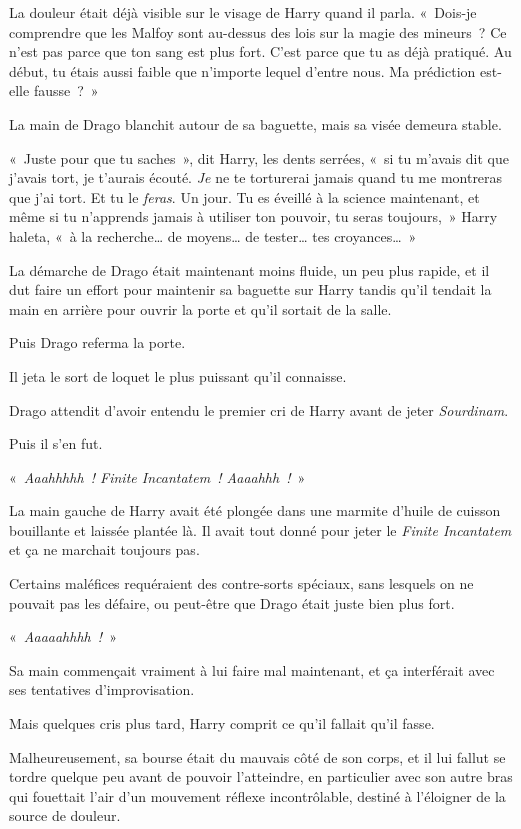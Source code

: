 La douleur était déjà visible sur le visage de Harry quand il parla.
«~Dois-je comprendre que les Malfoy sont au-dessus des lois sur la magie des mineurs~?
Ce n'est pas parce que ton sang est plus fort.
C'est parce que tu as déjà pratiqué.
Au début, tu étais aussi faible que n'importe lequel d'entre nous.
Ma prédiction est-elle fausse~?~»

La main de Drago blanchit autour de sa baguette, mais sa visée demeura stable.

«~Juste pour que tu saches~», dit Harry, les dents serrées, «~si tu m'avais dit que j'avais tort, je t'aurais écouté.
\emph{Je} ne te torturerai jamais quand tu me montreras que j'ai tort.
Et tu le \emph{feras}.
Un jour.
Tu es éveillé à la science maintenant, et même si tu n'apprends jamais à utiliser ton pouvoir, tu seras toujours,~» Harry haleta, «~à la recherche… de moyens… de tester… tes croyances…~»

La démarche de Drago était maintenant moins fluide, un peu plus rapide, et il dut faire un effort pour maintenir sa baguette sur Harry tandis qu'il tendait la main en arrière pour ouvrir la porte et qu'il sortait de la salle.

Puis Drago referma la porte.

Il jeta le sort de loquet le plus puissant qu'il connaisse.

Drago attendit d'avoir entendu le premier cri de Harry avant de jeter \emph{Sourdinam}.

Puis il s'en fut.

\later

«~\emph{Aaahhhhh~!
Finite Incantatem~!
Aaaahhh~!}~»

La main gauche de Harry avait été plongée dans une marmite d'huile de cuisson bouillante et laissée plantée là.
Il avait tout donné pour jeter le \emph{Finite Incantatem} et ça ne marchait toujours pas.

Certains maléfices requéraient des contre-sorts spéciaux, sans lesquels on ne pouvait pas les défaire, ou peut-être que Drago était juste bien plus fort.

«~\emph{Aaaaahhhh~!}~»

Sa main commençait vraiment à lui faire mal maintenant, et ça interférait avec ses tentatives d'improvisation.

Mais quelques cris plus tard, Harry comprit ce qu'il fallait qu'il fasse.

Malheureusement, sa bourse était du mauvais côté de son corps, et il lui fallut se tordre quelque peu avant de pouvoir l'atteindre, en particulier avec son autre bras qui fouettait l'air d'un mouvement réflexe incontrôlable, destiné à l'éloigner de la source de douleur.

